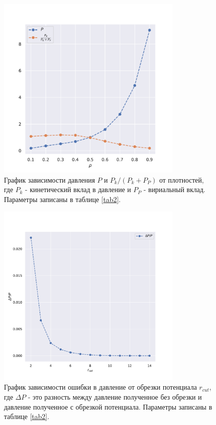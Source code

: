 \documentclass[a4paper,12pt]{report}
\begin{document}
\begin{figure}[H]
    \centering
    \includegraphics[width=0.8\textwidth]{../../media/pressure.pdf}
\caption{График зависимости давления \(P\) и \(P_k / (P_k + P_P)\) от плотностей, где \(P_k\) - кинетический вклад в давление и \(P_P\) - вириальный вклад. Параметры записаны в таблице \ref{tab2}.}
    \label{fig-eos}
\end{figure}

\begin{figure}[H]
    \centering
    \includegraphics[width=0.8\textwidth]{../../media/rcut.pdf}
    \caption{График зависимости ошибки в давление от обрезки потенциала \(r_{cut}\), где \(\Delta P\) - это разность между давление полученное без обрезки и давление полученное с обрезкой потенциала. Параметры записаны в таблице \ref{tab2}.}
    \label{fig-rcut}
\end{figure}
\end{document}
